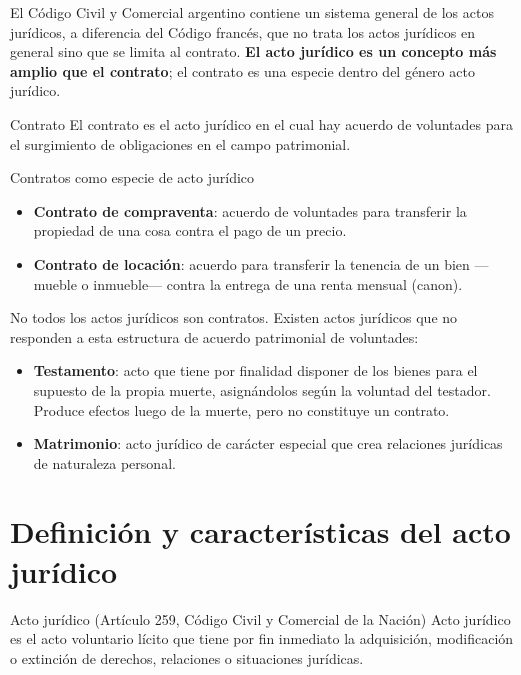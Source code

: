 \documentclass[12pt,oneside]{book}
\begin{document}
El Código Civil y Comercial argentino contiene un sistema general de los actos jurídicos, a diferencia del Código francés, que no trata los actos jurídicos en general sino que se limita al contrato. \textbf{El acto jurídico es un concepto más amplio que el contrato}; el contrato es una especie dentro del género acto jurídico.

\begin{definition}{Contrato}
El contrato es el acto jurídico en el cual hay acuerdo de voluntades para el surgimiento de obligaciones en el campo patrimonial.
\end{definition}

\begin{example}{Contratos como especie de acto jurídico}
\begin{itemize}
    \item \textbf{Contrato de compraventa}: acuerdo de voluntades para transferir la propiedad de una cosa contra el pago de un precio.
    \item \textbf{Contrato de locación}: acuerdo para transferir la tenencia de un bien —mueble o inmueble— contra la entrega de una renta mensual (canon).
\end{itemize}
\end{example}

No todos los actos jurídicos son contratos. Existen actos jurídicos que no responden a esta estructura de acuerdo patrimonial de voluntades:

\begin{itemize}
    \item \textbf{Testamento}: acto que tiene por finalidad disponer de los bienes para el supuesto de la propia muerte, asignándolos según la voluntad del testador. Produce efectos luego de la muerte, pero no constituye un contrato.
    \item \textbf{Matrimonio}: acto jurídico de carácter especial que crea relaciones jurídicas de naturaleza personal.
\end{itemize}

\section{Definición y características del acto jurídico}

\begin{definition}{Acto jurídico (Artículo 259, Código Civil y Comercial de la Nación)}
Acto jurídico es el acto voluntario lícito que tiene por fin inmediato la adquisición, modificación o extinción de derechos, relaciones o situaciones jurídicas.
\end{definition}
\end{document}
